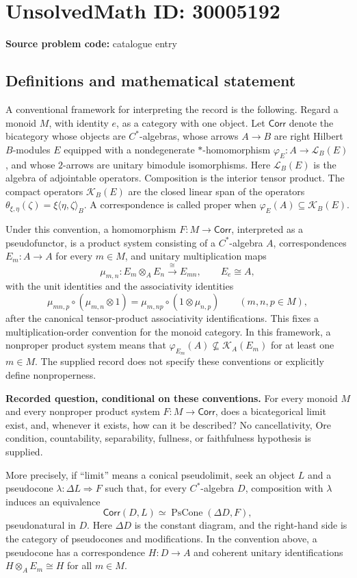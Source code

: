 \documentclass[11pt]{article}
\begin{document}
\section*{UnsolvedMath ID: 30005192}
\textbf{Source problem code:} catalogue entry
\subsection{Definitions and mathematical statement}
A conventional framework for interpreting the record is the following. Regard a monoid \(M\), with identity \(e\), as a category with one object. Let \(\mathsf{Corr}\) denote the bicategory whose objects are \(C^*\)-algebras, whose arrows \(A\to B\) are right Hilbert \(B\)-modules \(E\) equipped with a nondegenerate \(*\)-homomorphism \(\varphi_E:A\to\mathcal L_B(E)\), and whose \(2\)-arrows are unitary bimodule isomorphisms. Here \(\mathcal L_B(E)\) is the algebra of adjointable operators. Composition is the interior tensor product. The compact operators \(\mathcal K_B(E)\) are the closed linear span of the operators \(\theta_{\xi,\eta}(\zeta)=\xi\langle\eta,\zeta\rangle_B\). A correspondence is called proper when \(\varphi_E(A)\subseteq\mathcal K_B(E)\).

Under this convention, a homomorphism \(F:M\to\mathsf{Corr}\), interpreted as a pseudofunctor, is a product system consisting of a \(C^*\)-algebra \(A\), correspondences \(E_m:A\to A\) for every \(m\in M\), and unitary multiplication maps
\[
\mu_{m,n}:E_m\otimes_A E_n\xrightarrow{\cong}E_{mn},\qquad E_e\cong A,
\]
with the unit identities and the associativity identities
\[
\mu_{mn,p}\circ(\mu_{m,n}\otimes 1)
=\mu_{m,np}\circ(1\otimes\mu_{n,p})
\qquad(m,n,p\in M),
\]
after the canonical tensor-product associativity identifications. This fixes a multiplication-order convention for the monoid category. In this framework, a nonproper product system means that \(\varphi_{E_m}(A)\nsubseteq\mathcal K_A(E_m)\) for at least one \(m\in M\). The supplied record does not specify these conventions or explicitly define nonproperness.

\textbf{Recorded question, conditional on these conventions.} For every monoid \(M\) and every nonproper product system \(F:M\to\mathsf{Corr}\), does a bicategorical limit exist, and, whenever it exists, how can it be described? No cancellativity, Ore condition, countability, separability, fullness, or faithfulness hypothesis is supplied.

More precisely, if ``limit'' means a conical pseudolimit, seek an object \(L\) and a pseudocone \(\lambda:\Delta L\Rightarrow F\) such that, for every \(C^*\)-algebra \(D\), composition with \(\lambda\) induces an equivalence
\[
\mathsf{Corr}(D,L)\simeq\operatorname{PsCone}(\Delta D,F),
\]
pseudonatural in \(D\). Here \(\Delta D\) is the constant diagram, and the right-hand side is the category of pseudocones and modifications. In the convention above, a pseudocone has a correspondence \(H:D\to A\) and coherent unitary identifications \(H\otimes_A E_m\cong H\) for all \(m\in M\).
\end{document}
